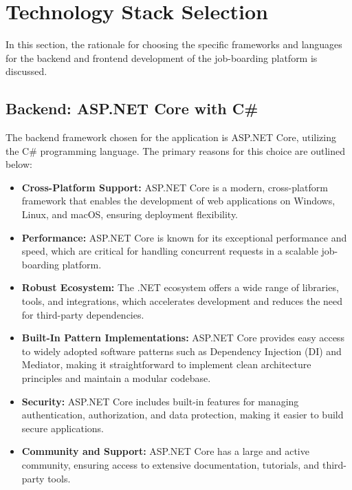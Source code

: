 \section{Technology Stack Selection}

In this section, the rationale for choosing the specific frameworks and languages for the backend and frontend development of the job-boarding platform is discussed.

\subsection{Backend: ASP.NET Core with C\#}
The backend framework chosen for the application is ASP.NET Core, utilizing the C\# programming language. The primary reasons for this choice are outlined below:

\begin{itemize}
    \item \textbf{Cross-Platform Support:} ASP.NET Core is a modern, cross-platform framework that enables the development of web applications on Windows, Linux, and macOS, ensuring deployment flexibility.
    
    \item \textbf{Performance:} ASP.NET Core is known for its exceptional performance and speed, which are critical for handling concurrent requests in a scalable job-boarding platform.
    
    \item \textbf{Robust Ecosystem:} The .NET ecosystem offers a wide range of libraries, tools, and integrations, which accelerates development and reduces the need for third-party dependencies.
    
    \item \textbf{Built-In Pattern Implementations:} ASP.NET Core provides easy access to widely adopted software patterns such as Dependency Injection (DI) and Mediator, making it straightforward to implement clean architecture principles and maintain a modular codebase.
    
    \item \textbf{Security:} ASP.NET Core includes built-in features for managing authentication, authorization, and data protection, making it easier to build secure applications.
    
    \item \textbf{Community and Support:} ASP.NET Core has a large and active community, ensuring access to extensive documentation, tutorials, and third-party tools.
\end{itemize}

